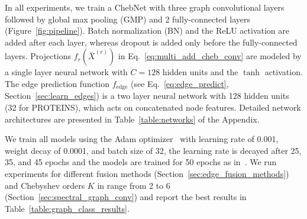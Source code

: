 \documentclass[final,nonatbib]{article} \usepackage{nips_2018}
\begin{document}
	In all experiments, we train a ChebNet with three graph convolutional layers followed by global max pooling (GMP) and 2 fully-connected layers (Figure~\ref{fig:pipeline}). Batch normalization (BN) and the ReLU activation are added after each layer, whereas dropout is added only before the fully-connected layers. Projections $f_r(\bar{X}^{(r)})$ in Eq.~\ref{eq:multi_add_cheb_conv} are modeled by a single layer neural network with $C=128$ hidden units and the $\tanh$ activation. The edge prediction function $f_{\text{edge}}$ (see Eq.~\ref{eq:edge_predict}, Section~\ref{sec:learn_edges}) is a two layer neural network with 128 hidden units (32 for PROTEINS), which acts on concatenated node features. Detailed network architectures are presented in Table~\ref{table:networks} of the Appendix.

	We train all models using the Adam optimizer~\cite{kingma2014adam} with learning rate of 0.001, weight decay of 0.0001, and batch size of 32, the learning rate is decayed after 25, 35, and 45 epochs and the models are trained for 50 epochs as in~\cite{simonovsky2017dynamic}.
	We run experiments for different fusion methods (Section~\ref{sec:edge_fusion_methods}) and Chebyshev orders $K$ in range from 2 to 6 (Section~\ref{sec:spectral_graph_conv}) and report the best results in Table~\ref{table:graph_class_results}.

	\newcommand\Tstrut{\rule{0pt}{2.6ex}}
	\newcommand\Bstrut{\rule[-0.9ex]{0pt}{0pt}}
	\newcommand{\std}[1]{{\scriptsize{$\pm$#1}}}
	\newcommand{\best}[1]{{\bfseries#1}}
\end{document}
